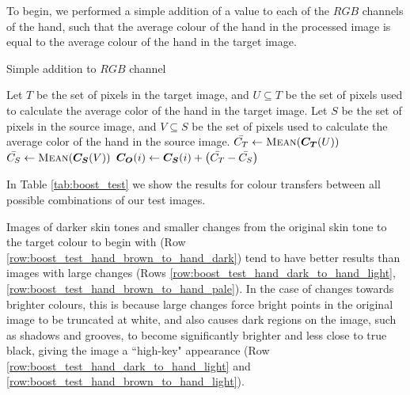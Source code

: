 To begin, we performed a simple addition of a value to each of the $RGB$ channels of the hand, such that the average colour of the hand in the processed image is equal to the average colour of the hand in the target image.

\begin{algorithm}[H]
\caption{Simple addition to $RGB$ channel}
\label{eq:boost_algo}
\begin{algorithmic}
\State Let $T$ be the set of pixels in the target image, and $U \subseteq T$ be the set of pixels used to calculate the average color of the hand in the target image.
\State Let $S$ be the set of pixels in the source image, and $V \subseteq S$ be the set of pixels used to calculate the average color of the hand in the source image.
\State $\mean{C_T} \gets \Call{Mean}{\vect{C_T}(U)}$
\State $\mean{C_S} \gets \Call{Mean}{\vect{C_S}(V)}$
\State $\boldsymbol{C_O}(i) \gets \boldsymbol{C_S}(i) + \left(\bar{C_T} - \bar{C_S}\right)$
\EndFor
\end{algorithmic}
\end{algorithm}


In Table \ref{tab:boost_test} we show the results for colour transfers between all possible combinations of our test images.


Images of darker skin tones and smaller changes from the original skin tone to the target colour to begin with (Row \ref{row:boost_test_hand_brown_to_hand_dark}) tend to have better results than images with large changes (Rows \ref{row:boost_test_hand_dark_to_hand_light}, \ref{row:boost_test_hand_brown_to_hand_pale}). In the case of changes towards brighter colours, this is because large changes force bright points in the original image to be truncated at white, and also causes dark regions on the image, such as shadows and grooves, to become significantly brighter and less close to true black, giving the image a ``high-key" appearance (Row \ref{row:boost_test_hand_dark_to_hand_light} and \ref{row:boost_test_hand_brown_to_hand_light}).

